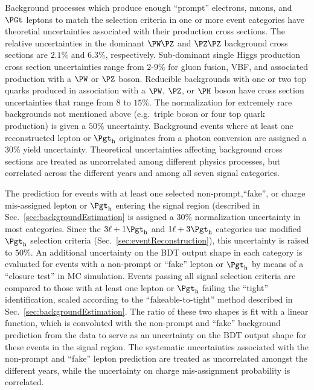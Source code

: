 Background processes which produce enough ``prompt'' electrons, muons,
and $\PGt$ leptons to match the selection criteria in one or more
event categories have theoretial uncertainties associated with their
production cross sections.
The relative uncertainties in the dominant $\PW\PZ$ and $\PZ\PZ$ background
cross sections are $2.1\%$ and $6.3\%$, respectively. %
Sub-dominant single Higgs production cross section uncertainties range
from $2$-$9\%$ for gluon fusion, VBF, and associated production with a
$\PW$ or $\PZ$ boson. %
Reducible backgrounds with one or two top quarks produced in association
with a $\PW$, $\PZ$, or $\PH$ boson have cross section uncertainties that
range from $8$ to $15\%$. %
The normalization for extremely rare backgrounds not mentioned above
(e.g.~triple boson or four top quark production) is given a $50\%$ uncertainty.
Background events where at least one reconstructed lepton or $\tauh$
originates from a photon conversion are assigned a $30\%$ yield uncertainty.
Theoretical uncertainties affecting background cross sections are treated
as uncorrelated among different physics processes, but correlated across
the different years and among all seven signal categories.

The prediction for events with at least one selected non-prompt,``fake'',
or charge mis-assigned lepton or $\tauh$ entering the signal region
(described in Sec.~\ref{sec:backgroundEstimation} is assigned a $30\%$
normalization uncertainty in most categories.
Since the $\lllt$ and $\lttt$ categories use modified $\tauh$ selection criteria
(Sec.~\ref{sec:eventReconstruction}), this uncertainty is raised to $50\%$.
An additional uncertainty on the BDT output shape in each category is
evaluated for events with a non-prompt or ``fake'' lepton or $\tauh$
by means of a ``closure test'' in MC simulation.
Events passing all signal selection criteria are compared to those
with at least one lepton or $\tauh$ failing the ``tight'' identification,
scaled according to the ``fakeable-to-tight'' method described in
Sec.~\ref{sec:backgroundEstimation}.
The ratio of these two shapes is fit with a linear function, which
is convoluted with the non-prompt and ``fake'' background prediction
from the data to serve as an uncertainty on the BDT output shape
for these events in the signal region.
The systematic uncertainties associated with the non-prompt and ``fake''
lepton prediction are treated as uncorrelated amongst the different
years, while the uncertainty on charge mis-assignment probability
is correlated.

